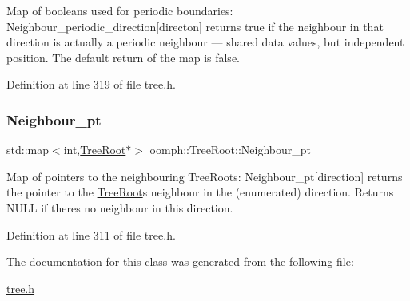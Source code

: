 Map of booleans used for periodic boundaries\+: Neighbour\+\_\+periodic\+\_\+direction\mbox{[}directon\mbox{]} returns true if the neighbour in that direction is actually a periodic neighbour --- shared data values, but independent position. The default return of the map is false. 



Definition at line 319 of file tree.\+h.

\mbox{\label{classoomph_1_1TreeRoot_a01e5f3564f923fa92015c444d9f656bd}} 
\subsubsection{\texorpdfstring{Neighbour\+\_\+pt}{Neighbour\_pt}}
{\footnotesize\ttfamily std\+::map$<$int,\hyperlink{classoomph_1_1TreeRoot}{Tree\+Root}$\ast$$>$ oomph\+::\+Tree\+Root\+::\+Neighbour\+\_\+pt\hspace{0.3cm}{\ttfamily [protected]}}



Map of pointers to the neighbouring Tree\+Roots\+: Neighbour\+\_\+pt\mbox{[}direction\mbox{]} returns the pointer to the \hyperlink{classoomph_1_1TreeRoot}{Tree\+Root}\textquotesingle{}s neighbour in the (enumerated) direction. Returns N\+U\+LL if there\textquotesingle{}s no neighbour in this direction. 



Definition at line 311 of file tree.\+h.



The documentation for this class was generated from the following file\+:\begin{DoxyCompactItemize}
\item 
\hyperlink{tree_8h}{tree.\+h}\end{DoxyCompactItemize}

